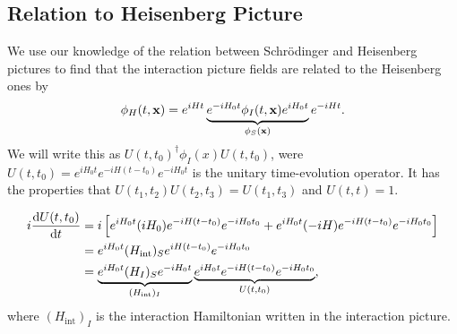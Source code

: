 \subsection{Relation to Heisenberg Picture}%
\label{sub:relation_to_heisenberg_picture}

We use our knowledge of the relation between Schrödinger and Heisenberg pictures to find that the interaction picture fields are related to the Heisenberg ones by
\begin{equation}
  \phi_H(t , \vb{x}) = e^{iH t} \underbrace{e^{-i H_0 t} \phi_I (t, \vb{x}) e^{i H_0 t}}_{\phi_S(\vb{x})} e^{-i H t}.
\end{equation}
We will write this as $U(t, t_0)^{\dagger} \phi_I(x) U(t, t_0)$, were $U(t, t_0) = e^{i H_0 t} e^{-i H(t-t_0)} e^{-i H_0 t}$ is the unitary time-evolution operator. It has the properties that $U(t_1, t_2) U(t_2, t_3) = U(t_1, t_3)$ and $U(t, t) = 1$.
\begin{leftbar}
  \begin{remark}
    \begin{align}
      i \dv{U(t, t_0)}{t} &= i \left[ e^{i H_0 t} (i H_0) e^{-i H(t - t_0)} e^{-i H_0 t_0} + e^{i H_0 t} (-iH) e^{-i H(t - t_0)}e^{-i H_0 t_0} \right] \\
			  &= e^{i H_0 t} (H_{\text{int}})_S e^{i H(t-t_0)} e^{-i H_0 t_0} \\
			  &= \underbrace{e^{iH_0 t} (H_I)_S e^{-i H_0 t}}_{(H_{\text{int}})_I} \underbrace{e^{iH_0 t} e^{-i H(t-t_0)} e^{-iH_0 t_0}}_{U(t, t_0)},
			  \label{eq:interaction-operators}
    \end{align}
    where $(H_{\text{int}})_I$ is the interaction Hamiltonian written in the interaction picture.

  \end{remark}
\end{leftbar}
